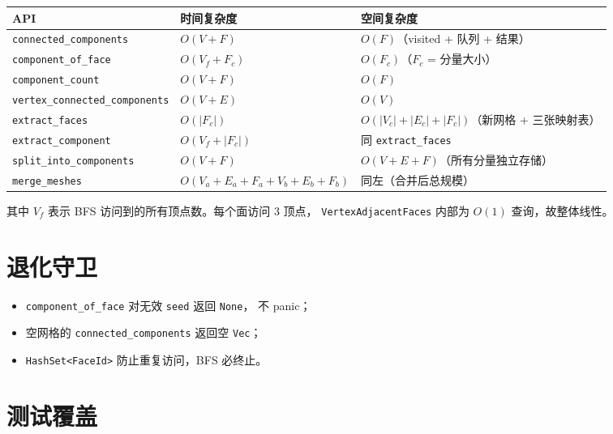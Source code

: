 \documentclass[11pt,a4paper]{article}
\begin{document}
\begin{center}
\renewcommand{\arraystretch}{1.18}
\begin{tabular}{@{}lll@{}}
  \toprule
  \textbf{API} & \textbf{时间复杂度} & \textbf{空间复杂度} \\
  \midrule
  \texttt{connected\_components}        & $O(V + F)$ & $O(F)$（visited + 队列 + 结果） \\
  \texttt{component\_of\_face}          & $O(V_f + F_c)$ & $O(F_c)$（$F_c$ = 分量大小） \\
  \texttt{component\_count}             & $O(V + F)$ & $O(F)$ \\
  \texttt{vertex\_connected\_components} & $O(V + E)$ & $O(V)$ \\
  \texttt{extract\_faces}               & $O(|F_c|)$ & $O(|V_c| + |E_c| + |F_c|)$（新网格 + 三张映射表） \\
  \texttt{extract\_component}           & $O(V_f + |F_c|)$ & 同 \texttt{extract\_faces} \\
  \texttt{split\_into\_components}      & $O(V + F)$ & $O(V + E + F)$（所有分量独立存储） \\
  \texttt{merge\_meshes}                & $O(V_a + E_a + F_a + V_b + E_b + F_b)$ & 同左（合并后总规模） \\
  \bottomrule
\end{tabular}
\end{center}

其中 $V_f$ 表示 BFS 访问到的所有顶点数。每个面访问 3 顶点，
\texttt{VertexAdjacentFaces} 内部为 $O(1)$ 查询，故整体线性。

\section{退化守卫}

\begin{itemize}
  \item \texttt{component\_of\_face} 对无效 \texttt{seed} 返回 \texttt{None}，
        不 panic；
  \item 空网格的 \texttt{connected\_components} 返回空 \texttt{Vec}；
  \item \texttt{HashSet<FaceId>} 防止重复访问，BFS 必终止。
\end{itemize}

\section{测试覆盖}
\end{document}
